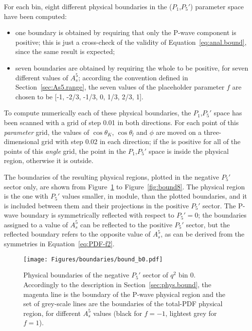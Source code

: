 
For each bin, eight different physical boundaries in the ($P_1$,$P_5'$) parameter space have been computed:
\begin{itemize}
\item one boundary is obtained by requiring that only the P-wave component is positive; this is just a cross-check of the validity of Equation~\ref{eq:anal.bound}, since the same result is expected;
\item seven boundaries are obtained by requiring the whole \pdf to be positive, for seven different values of $A_s^5$; according the convention defined in Section~\ref{sec:As5.range}, the seven values of the placeholder parameter $f$ are chosen to be [-1, -2/3, -1/3, 0, 1/3, 2/3, 1].
\end{itemize}

To compute numerically each of these physical boundaries, the $P_1$,$P_5'$ space has been scanned with a grid of step 0.01 in both directions.
For each point of this \textit{parameter} grid, the values of $\cos\theta_K$, $\cos\theta_l$ and $\phi$ are moved on a three-dimensional grid with step 0.02 in each direction; if the \pdf is positive for all of the points of this \textit{angle} grid, the point in the $P_1$,$P_5'$ space is inside the physical region, otherwise it is outside.

The boundaries of the resulting physical regions, plotted in the negative $P_5'$ sector only, are shown from Figure~\ref{fig:bound0} to Figure~\ref{fig:bound8}.
The physical region is the one with $P_5'$ values smaller, in module, than the plotted boundaries, and it is included between them and their projections in the positive $P_5'$ sector. 
The P-wave boundary is symmetrically reflected with respect to $P_5'=0$; the boundaries assigned to a value of $A_s^5$ can be reflected to the positive $P_5'$ sector, but the reflected boundary refers to the opposite value of $A_s^5$, as can be derived from the symmetries in Equation~\ref{eq:PDF-f2}.

\begin{figure}[!hbt]
  \centering
  \texttt{[image: Figures/boundaries/bound\_b0.pdf]}
  \caption{Physical boundaries of the negative $P_5'$ sector of $q^2$ bin 0.
    Accordingly to the description in Section~\ref{sec:phys.bound}, the magenta line is the boundary of the P-wave physical region and the set of grey-scale lines are the boundaries of the total-PDF physical region, for different $A_s^5$ values (black for $f=-1$, lightest grey for $f=1$).}
  \label{fig:bound0}
\end{figure}

